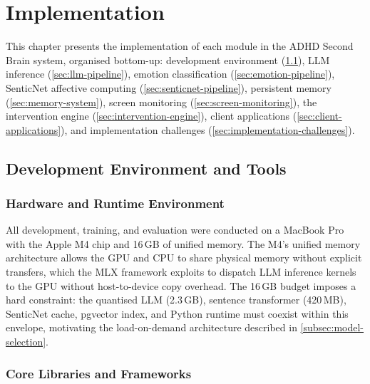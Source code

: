 \chapter{Implementation}
\label{ch:implementation}

This chapter presents the implementation of each module in the ADHD Second Brain system, organised bottom-up: development environment (\cref{sec:dev-environment}), LLM inference (\cref{sec:llm-pipeline}), emotion classification (\cref{sec:emotion-pipeline}), SenticNet affective computing (\cref{sec:senticnet-pipeline}), persistent memory (\cref{sec:memory-system}), screen monitoring (\cref{sec:screen-monitoring}), the intervention engine (\cref{sec:intervention-engine}), client applications (\cref{sec:client-applications}), and implementation challenges (\cref{sec:implementation-challenges}).

\section{Development Environment and Tools}
\label{sec:dev-environment}

\subsection{Hardware and Runtime Environment}
\label{subsec:hardware-runtime}

All development, training, and evaluation were conducted on a MacBook Pro with the Apple M4 chip and 16\,GB of unified memory. The M4's unified memory architecture allows the GPU and CPU to share physical memory without explicit transfers, which the MLX framework \cite{hannun2023} exploits to dispatch LLM inference kernels to the GPU without host-to-device copy overhead. The 16\,GB budget imposes a hard constraint: the quantised LLM (2.3\,GB), sentence transformer (420\,MB), SenticNet cache, pgvector index, and Python runtime must coexist within this envelope, motivating the load-on-demand architecture described in \cref{subsec:model-selection}.

\subsection{Core Libraries and Frameworks}
\label{subsec:core-libraries}

